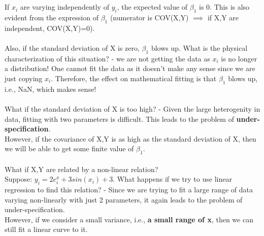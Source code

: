 \documentclass[12pt]{article}
\begin{document}
\\
\\
\normalsize If $x_i$ are varying independently of $y_i$, the expected value of $\beta_1$ is 0. This is also evident from the expression of $\beta_1$ (numerator is COV(X,Y) $\implies$ if X,Y are independent, COV(X,Y)=0).\\
\\
Also, if the standard deviation of X is zero, $\beta_1$ blows up. What is the physical characterization of this situation? - we are not getting the data as $x_i$ is no longer a distribution! One cannot fit the data as it doesn't make any sense since we are just copying $x_i$. Therefore, the effect on mathematical fitting is that $\beta_1$ blows up, i.e., NaN, which makes sense!\\
\\
What if the standard deviation of X is too high? - Given the large heterogenity in data, fitting with two parameters is difficult. This leads to the problem of \textbf{under-specification}.\\
However, if the covariance of X,Y is as high as the standard deviation of X, then we will be able to get some finite value of $\beta_1$.\\
\\
What if X,Y are related by a non-linear relation?\\
Suppose: $y_i = 2e^x_i + 3sin(x_i) + 3$. What happens if we try to use linear regression to find this relation? - Since we are trying to fit a large range of data varying non-linearly with just 2 parameters, it again leads to the problem of under-specification.\\
However, if we consider a small variance, i.e., \textbf{a small range of x}, then we can still fit a linear curve to it.
\end{document}
